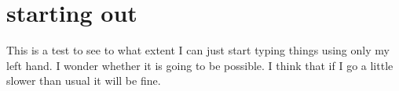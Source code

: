 \documentclass{article}
\begin{document}
\section{starting out}

This is a test to see to what extent I can just start typing things using only my left hand.  I wonder whether it is going to be possible.  I think that if I go a little slower than usual it will be fine.
\end{document}
